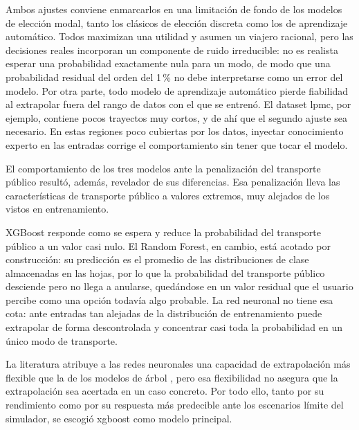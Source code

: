 Ambos ajustes conviene enmarcarlos en una limitación de fondo de los modelos de elección modal, tanto los clásicos de elección discreta como los de aprendizaje automático. Todos maximizan una utilidad y asumen un viajero racional, pero las decisiones reales incorporan un componente de ruido irreducible: no es realista esperar una probabilidad exactamente nula para un modo, de modo que una probabilidad residual del orden del 1\,\% no debe interpretarse como un error del modelo. Por otra parte, todo modelo de aprendizaje automático pierde fiabilidad al extrapolar fuera del rango de datos con el que se entrenó. El dataset \gls{lpmc}, por ejemplo, contiene pocos trayectos muy cortos, y de ahí que el segundo ajuste sea necesario. En estas regiones poco cubiertas por los datos, inyectar conocimiento experto en las entradas corrige el comportamiento sin tener que tocar el modelo.\newline

El comportamiento de los tres modelos ante la penalización del transporte público resultó, además, revelador de sus diferencias. Esa penalización lleva las características de transporte público a valores extremos, muy alejados de los vistos en entrenamiento.\newline

XGBoost responde como se espera y reduce la probabilidad del transporte público a un valor casi nulo. El Random Forest, en cambio, está acotado por construcción: su predicción es el promedio de las distribuciones de clase almacenadas en las hojas, por lo que la probabilidad del transporte público desciende pero no llega a anularse, quedándose en un valor residual que el usuario percibe como una opción todavía algo probable. La red neuronal no tiene esa cota: ante entradas tan alejadas de la distribución de entrenamiento puede extrapolar de forma descontrolada y concentrar casi toda la probabilidad en un único modo de transporte. \newpage

La literatura atribuye a las redes neuronales una capacidad de extrapolación más flexible que la de los modelos de árbol \cite{Goodfellow2016}, pero esa flexibilidad no asegura que la extrapolación sea acertada en un caso concreto. Por todo ello, tanto por su rendimiento como por su respuesta más predecible ante los escenarios límite del simulador, se escogió \gls{xgboost} como modelo principal.